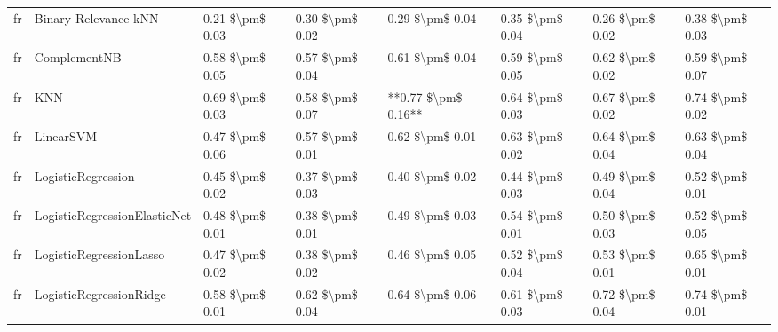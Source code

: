 \begin{tabular}{llllllll}
      fr &            Binary Relevance kNN &     0.21 \$\textbackslash pm\$ 0.03 &           0.30 \$\textbackslash pm\$ 0.02 &       0.29 \$\textbackslash pm\$ 0.04 &        0.35 \$\textbackslash pm\$ 0.04 &                         0.26 \$\textbackslash pm\$ 0.02 &     0.38 \$\textbackslash pm\$ 0.03 \\
      fr &                    ComplementNB &     0.58 \$\textbackslash pm\$ 0.05 &           0.57 \$\textbackslash pm\$ 0.04 &       0.61 \$\textbackslash pm\$ 0.04 &        0.59 \$\textbackslash pm\$ 0.05 &                         0.62 \$\textbackslash pm\$ 0.02 &     0.59 \$\textbackslash pm\$ 0.07 \\
      fr &                             KNN &     0.69 \$\textbackslash pm\$ 0.03 &           0.58 \$\textbackslash pm\$ 0.07 &   **0.77 \$\textbackslash pm\$ 0.16** &        0.64 \$\textbackslash pm\$ 0.03 &                         0.67 \$\textbackslash pm\$ 0.02 &     0.74 \$\textbackslash pm\$ 0.02 \\
      fr &                       LinearSVM &     0.47 \$\textbackslash pm\$ 0.06 &           0.57 \$\textbackslash pm\$ 0.01 &       0.62 \$\textbackslash pm\$ 0.01 &        0.63 \$\textbackslash pm\$ 0.02 &                         0.64 \$\textbackslash pm\$ 0.04 &     0.63 \$\textbackslash pm\$ 0.04 \\
      fr &              LogisticRegression &     0.45 \$\textbackslash pm\$ 0.02 &           0.37 \$\textbackslash pm\$ 0.03 &       0.40 \$\textbackslash pm\$ 0.02 &        0.44 \$\textbackslash pm\$ 0.03 &                         0.49 \$\textbackslash pm\$ 0.04 &     0.52 \$\textbackslash pm\$ 0.01 \\
      fr &    LogisticRegressionElasticNet &     0.48 \$\textbackslash pm\$ 0.01 &           0.38 \$\textbackslash pm\$ 0.01 &       0.49 \$\textbackslash pm\$ 0.03 &        0.54 \$\textbackslash pm\$ 0.01 &                         0.50 \$\textbackslash pm\$ 0.03 &     0.52 \$\textbackslash pm\$ 0.05 \\
      fr &         LogisticRegressionLasso &     0.47 \$\textbackslash pm\$ 0.02 &           0.38 \$\textbackslash pm\$ 0.02 &       0.46 \$\textbackslash pm\$ 0.05 &        0.52 \$\textbackslash pm\$ 0.04 &                         0.53 \$\textbackslash pm\$ 0.01 &     0.65 \$\textbackslash pm\$ 0.01 \\
      fr &         LogisticRegressionRidge &     0.58 \$\textbackslash pm\$ 0.01 &           0.62 \$\textbackslash pm\$ 0.04 &       0.64 \$\textbackslash pm\$ 0.06 &        0.61 \$\textbackslash pm\$ 0.03 &                         0.72 \$\textbackslash pm\$ 0.04 &     0.74 \$\textbackslash pm\$ 0.01 \\

\end{tabular}
